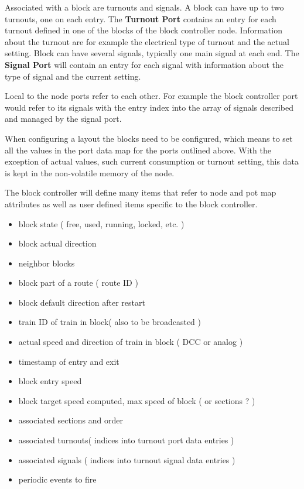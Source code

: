 Associated with a block are turnouts and signals. A block can have up to two turnouts, one on each entry. The \textbf{Turnout Port} contains an entry for each turnout defined in one of the blocks of the block controller node. Information about the turnout are for example the electrical type of turnout and the actual setting. Block can have several signals, typically one main signal at each end. The \textbf{Signal Port} will contain an entry for each signal with information about the  type of signal and the current setting.

Local to the node ports refer to each other. For example the block controller port would refer to its signals with the entry index into the array of signals described and managed by the signal port.

When configuring a layout the blocks need to be configured, which means to set all the values in the port data map for the ports outlined above. With the exception of actual values, such current consumption or turnout setting, this data is kept in the non-volatile memory of the node.

The block controller will define many items that refer to node and pot map attributes as well as user defined items specific to the block controller.


\begin{itemize}
\item block state ( free, used, running, locked, etc. )
\item block actual direction
\item neighbor blocks
\item block part of a route ( route ID )
\item block default direction after restart
\item train ID of train in block( also to be broadcasted )
\item actual speed and direction of train in block ( DCC or analog )
\item timestamp of entry and exit
\item block entry speed
\item block target speed computed, max speed of block ( or sections ? )
\item associated sections and order
\item associated turnouts( indices into turnout port data entries )
\item associated signals ( indices into turnout signal data entries )
\item periodic events to fire
\end{itemize}

